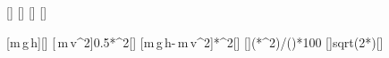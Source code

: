 [\kg]
[\meter]
[\mps]
[\mpss]

[m\,g\,h]{\mSX*\gX*\hSX}[\joule]
[\,m\,v^2]{0.5*\mSX*\vSX^2}[\joule]
[m\,g\,h-\,m\,v^2]{\mSX*\gX*{}*\mSX*\vSX^2}[\joule]
[]{(\mSX*\gX*{}*\mSX*\vSX^2)/(\mSX*\gX*\hSX)*100}
[]{sqrt(2*\gX*\hSX)}[\mps]
